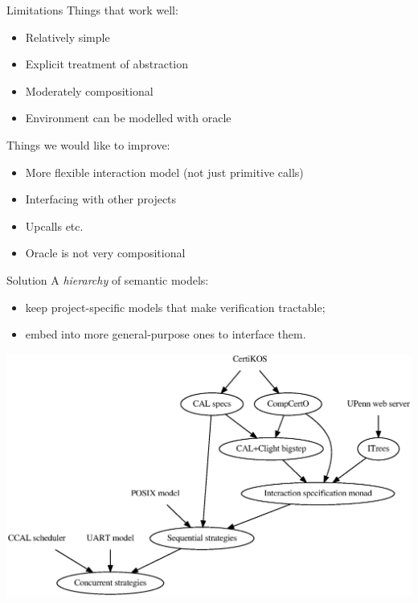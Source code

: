 \documentclass{beamer}
\begin{document}
\begin{frame}{Limitations}
  Things that work well:
  \begin{itemize}
    \item Relatively simple
    \item Explicit treatment of abstraction
    \item Moderately compositional
    \item Environment can be modelled with oracle
  \end{itemize}

  \vfill
  Things we would like to improve:
  \begin{itemize}
    \item More flexible interaction model (not just primitive calls)
    \item Interfacing with other projects
    \item Upcalls etc.
    \item Oracle is not very compositional
  \end{itemize}
\end{frame}

\begin{frame}{Solution}
  A \emph{hierarchy} of semantic models:
  \begin{itemize}
    \item keep project-specific models
      that make verification tractable;
    \item embed into more general-purpose ones
      to interface them.
  \end{itemize}

  \begin{center}
  \includegraphics[scale=0.4]{hierarchy}
  \end{center}
\end{frame}
\end{document}
